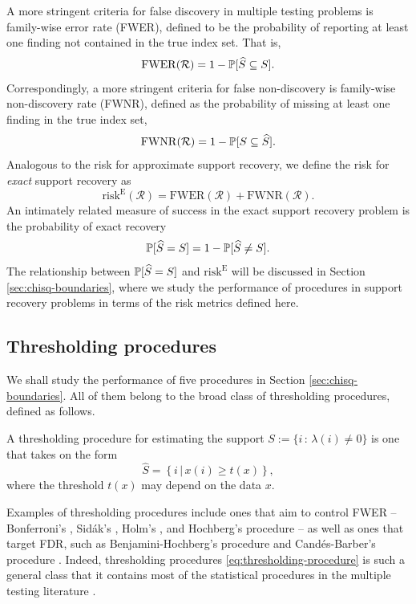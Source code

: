 A more stringent criteria for false discovery in multiple testing problems is family-wise error rate (FWER), defined to be the probability of reporting at least one finding not contained in the true index set.
That is,
\begin{equation} \label{eq:FWER}
    \mathrm{FWER}(\mathcal{R}) = 1 - \P[\widehat{S} \subseteq S].
\end{equation}
Correspondingly, a more stringent criteria for false non-discovery is family-wise non-discovery rate (FWNR), defined as the probability of missing at least one finding in the true index set,
\begin{equation} \label{eq:FWNDR}
    \mathrm{FWNR}(\mathcal{R}) = 1 - \P[S \subseteq \widehat{S}].
\end{equation}
Analogous to the risk for approximate support recovery, we define the risk for \emph{exact} support recovery as
\begin{equation} \label{eq:risk-exact}
    \mathrm{risk}^{\mathrm{E}}(\mathcal{R}) = \mathrm{FWER}(\mathcal{R}) + \mathrm{FWNR}(\mathcal{R}).
\end{equation}
An intimately related measure of success in the exact support recovery problem is the probability of exact recovery 
\begin{equation} \label{eq:risk-prob}
    \P[\widehat{S} = S] = 1 - \P[\widehat{S} \neq S].
\end{equation}
The relationship between $\P[\widehat{S} = S]$ and $\mathrm{risk}^{\mathrm{E}}$ will be discussed in Section \ref{sec:chisq-boundaries}, where we study the performance of procedures in support recovery problems in terms of the risk metrics defined here.

\subsection{Thresholding procedures}
\label{subsec:thresholding-procedures}

We shall study the performance of five procedures in Section \ref{sec:chisq-boundaries}.
All of them belong to the broad class of thresholding procedures, defined as follows.
\begin{definition}
A thresholding procedure for estimating the support 
$S:=\{i\, :\, \lambda(i)\neq0\}$ is one that takes on the form
\begin{equation} \label{eq:thresholding-procedure}
    \widehat{S} = \left\{i\,|\,x(i) \ge t(x)\right\},
\end{equation}
where the threshold $t(x)$ may depend on the data $x$.
\end{definition}
Examples of thresholding procedures include ones that aim to control FWER -- Bonferroni's \cite{dunn1961multiple}, Sid\'ak's \citep{vsidak1967rectangular}, Holm's \citep{holm1979simple}, and Hochberg's procedure \citep{hochberg1988sharper} -- as well as ones that target FDR, such as Benjamini-Hochberg's procedure \cite{benjamini1995controlling} and Cand\'es-Barber's procedure \cite{barber2015controlling}.
Indeed, thresholding procedures \eqref{eq:thresholding-procedure} is such a general class that it contains most of the statistical procedures in the multiple testing literature \cite{roquain2011type}.

